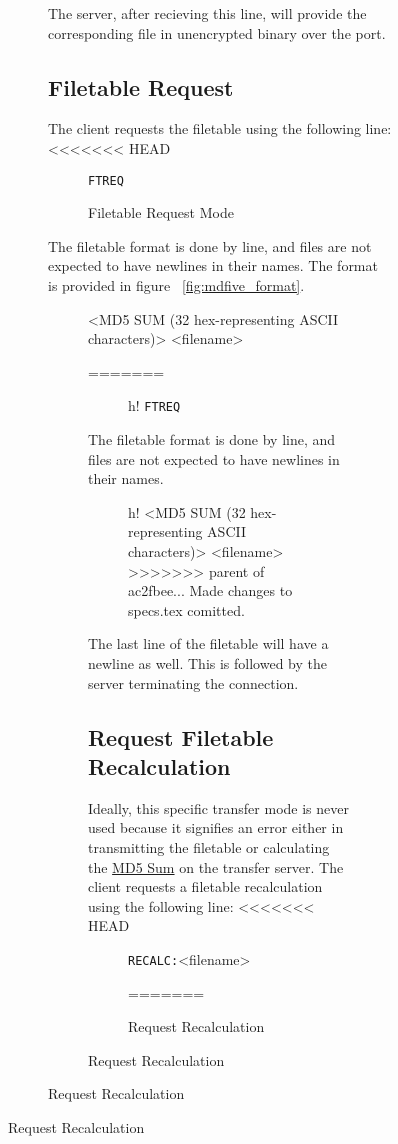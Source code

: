 \documentclass[12pt]{article}
\begin{document}
\begin{figure}[H]
\begin{figure}[H]
The server, after recieving this line, will provide the corresponding file in
unencrypted binary over the port.

\subsection{Filetable Request}
\label{sec:request_filetable}
The client requests the filetable using the following line:
<<<<<<< HEAD
\begin{figure}[H]
	\centering
	\verb+FTREQ+\carriagereturn\carriagereturn
	\caption{Filetable Request Mode}
	\label{fig:request_filetable}
\end{figure}

The filetable format is done by line, and files are not expected to have
newlines in their names.  The format is provided in figure~
\ref{fig:mdfive_format}.
\begin{figure}[H]
	\centering
	<MD5 SUM (32 hex-representing ASCII characters)>\textvisiblespace
	\textvisiblespace<filename>\carriagereturn
	\caption{MD5 Sum and Filename Specification}
	\label{fig:mdfive_format}
=======

\begin{figure}{h!}
	\centering
	\verb+FTREQ+\carriagereturn\carriagereturn
	\label{Filetable Request Mode}
\end{figure}

The filetable format is done by line, and files are not expected to have
newlines in their names.

\begin{figure}{h!}
	\centering
	<MD5 SUM (32 hex-representing ASCII characters)>\textvisiblespace
	\textvisiblespace<filename>\carriagereturn
	\label{MD5 Sum and Filename Specification}
>>>>>>> parent of ac2fbee... Made changes to specs.tex comitted.
\end{figure}

The last line of the filetable will have a newline as well.  This is followed
by the server terminating the connection.

\subsection{Request Filetable Recalculation}
\label{sec:recalculate_MD5}
Ideally, this specific transfer mode is never used because it signifies an
error either in transmitting the filetable or calculating the
\href{http://en.wikipedia.org/wiki/Md5sum}{MD5 Sum} on the transfer server.
The client requests a filetable recalculation using the following line:
<<<<<<< HEAD
\begin{figure}[H]
	\centering
	\verb+RECALC:+\textvisiblespace <filename>\carriagereturn\carriagereturn
	\caption{Request Recalculation}
	\label{fig:recalculate_request}
=======


\end{figure}
\end{figure}
\end{figure}
\end{figure}
\end{document}
